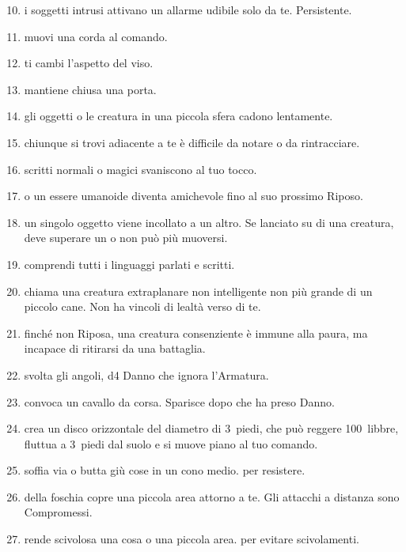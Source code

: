 \documentclass[itdr]{subfiles}
\begin{document}
\begin{enumerate}
	\setcounter{enumi}{9}
	\item {} i soggetti intrusi attivano un allarme udibile solo da te. Persistente.
	\item {} muovi una corda al comando.
	\item {} ti cambi l’aspetto del viso.
	\item {} mantiene chiusa una porta.
	\item {} gli oggetti o le creatura in una piccola sfera cadono lentamente.
	\item {} chiunque si trovi adiacente a te è difficile da notare o da rintracciare.
	\item {} scritti normali o magici svaniscono al tuo tocco.
	\item {}  o un essere umanoide diventa amichevole fino al suo prossimo Riposo.
	\item {} un singolo oggetto viene incollato a un altro. Se lanciato su di una creatura, deve superare un  o non può più muoversi.
	\item {} comprendi tutti i linguaggi parlati e scritti.
	\item {} chiama una creatura extraplanare non intelligente non più grande di un piccolo cane. Non ha vincoli di lealtà verso di te.
	\item {} finché non Riposa, una creatura consenziente è immune alla paura, ma incapace di ritirarsi da una battaglia.
	\item {} svolta gli angoli, d4 Danno che ignora l’Armatura.
	\item {} convoca un cavallo da corsa. Sparisce dopo che ha preso Danno.
	\item {} crea un disco orizzontale del diametro di 3~piedi, che può reggere 100~libbre, fluttua a 3~piedi dal suolo e si muove piano al tuo comando.
	\item {} soffia via o butta giù cose in un cono medio.  per resistere.
	\item {} della foschia copre una piccola area attorno a te. Gli attacchi a distanza sono Compromessi.
	\item {} rende scivolosa una cosa o una piccola area.  per evitare scivolamenti.

\end{enumerate}
\end{document}
